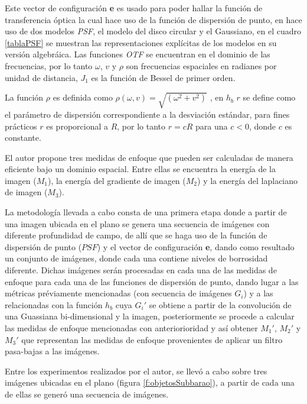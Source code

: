 Este vector de configuración \textbf{e} es usado para poder hallar la función de transferencia óptica la cual hace uso de la función de dispersión de punto, en \citet{Subbarao1993} hace uso de dos modelos \emph{PSF}, el modelo del disco circular y el Gaussiano, en el cuadro \ref{tablaPSF} se muestran las representaciones explícitas de los modelos en su versión algebráica.
Las funciones \emph{OTF} se encuentran en el dominio de las frecuencias, por lo tanto $\omega$, $v$ y $\rho$ son frecuencias espaciales en radianes por unidad de distancia, $J_1$ es la función de Bessel de primer orden.

La función $\rho$ es definida como $\rho(\omega,v) = \sqrt{(\omega ^2 + v^2 )}$ , en $h_b$ $r$ se define como el parámetro de dispersión correspondiente a la desviación estándar, para fines prácticos $r$ es proporcional a $R$, por lo tanto $r = cR$ para una $c < 0$, donde $c$ es constante.




El autor propone tres medidas de enfoque que pueden ser calculadas de manera eficiente bajo un dominio espacial. Entre ellas se encuentra la energía de la imagen ($M_1$), la energía del gradiente de imagen ($M_2$) y la energía del laplaciano de imagen ($M_3$).

La metodología llevada a cabo consta de una primera etapa donde a partir de una imagen ubicada en el plano se genera una secuencia de imágenes con diferente profundidad de campo, de allí que se haga uso de la función de dispersión de punto ($PSF$) y el vector de configuración \textbf{e}, dando como resultado un conjunto de imágenes, donde cada una contiene niveles de borrosidad diferente. Dichas imágenes serán procesadas en cada una de las medidas de enfoque para cada una de las funciones de dispersión de punto, dando lugar a las métricas préviamente mencionadas (con secuencia de imágenes $G_i$) y a las relacionadas con la función $h_b$ cuya $G_i'$ se obtiene a partir de la convolución de una Guassiana bi-dimensional y la imagen, posteriormente se procede a calcular las medidas de enfoque mencionadas con anteriorioridad y así obtener $M_1'$, $M_2'$ y $M_3'$ que representan las medidas de enfoque provenientes de aplicar un filtro pasa-bajas a las imágenes.


Entre los experimentos realizados por el autor, se llevó a cabo sobre tres imágenes ubicadas en el plano (figura \ref{f:objetosSubbarao}), a partir de cada una de ellas se generó una secuencia de imágenes. 

